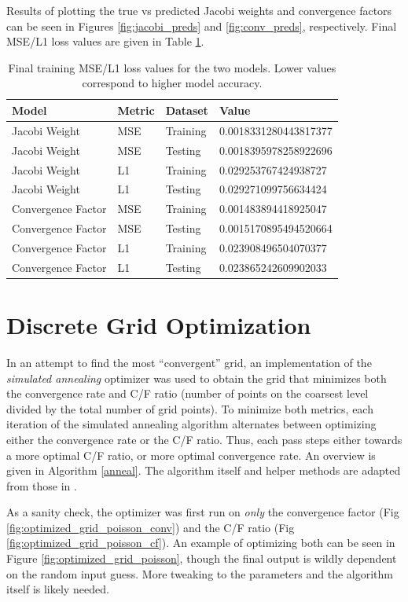 Results of plotting the true vs predicted Jacobi weights and convergence factors can be seen in Figures \ref{fig:jacobi_preds} and \ref{fig:conv_preds}, respectively.  Final MSE/L1 loss values are given in Table \ref{tab:loss}.

\begin{table}[t]
\centering
\begin{tabular}{|l|l|l|l|}
\hline
Model & Metric & Dataset & Value \\

\hline
Jacobi Weight & MSE & Training & 0.0018331280443817377 \\
Jacobi Weight & MSE & Testing & 0.0018395978258922696 \\
Jacobi Weight & L1 & Training & 0.029253767424938727 \\
Jacobi Weight & L1 & Testing & 0.029271099756634424 \\
\hline
Convergence Factor & MSE & Training & 0.001483894418925047 \\
Convergence Factor & MSE & Testing & 0.0015170895494520664 \\
Convergence Factor & L1 & Training & 0.023908496504070377 \\
Convergence Factor & L1 & Testing & 0.023865242609902033 \\
\hline
\end{tabular}
\caption{Final training MSE/L1 loss values for the two models.  Lower values correspond to higher model accuracy.}
\label{tab:loss}
\end{table}

\section{Discrete Grid Optimization}

In an attempt to find the most ``convergent'' grid, an implementation of the \textit{simulated annealing} optimizer was used to obtain the grid that minimizes both the convergence rate and C/F ratio (number of points on the coarsest level divided by the total number of grid points).  To minimize both metrics, each iteration of the simulated annealing algorithm alternates between optimizing either the convergence rate or the C/F ratio.  Thus, each pass steps either towards a more optimal C/F ratio, or more optimal convergence rate.  An overview is given in Algorithm \ref{anneal}.  The algorithm itself and helper methods are adapted from those in \citep{Bertsimas1993}.

As a sanity check, the optimizer was first run on \textit{only} the convergence factor (Fig \ref{fig:optimized_grid_poisson_conv}) and the C/F ratio (Fig \ref{fig:optimized_grid_poisson_cf}).  An example of optimizing both can be seen in Figure \ref{fig:optimized_grid_poisson}, though the final output is wildly dependent on the random input guess.  More tweaking to the parameters and the algorithm itself is likely needed.

